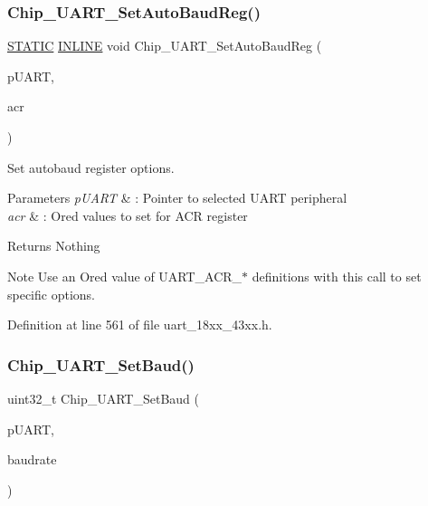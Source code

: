 \subsubsection{\texorpdfstring{Chip\+\_\+\+U\+A\+R\+T\+\_\+\+Set\+Auto\+Baud\+Reg()}{Chip\_UART\_SetAutoBaudReg()}}
{\footnotesize\ttfamily \hyperlink{group___l_p_c___types___public___macros_ga10b2d890d871e1489bb02b7e70d9bdfb}{S\+T\+A\+T\+IC} \hyperlink{spifi__18xx__43xx_8h_a2eb6f9e0395b47b8d5e3eeae4fe0c116}{I\+N\+L\+I\+NE} void Chip\+\_\+\+U\+A\+R\+T\+\_\+\+Set\+Auto\+Baud\+Reg (\begin{DoxyParamCaption}\item[{\hyperlink{struct_l_p_c___u_s_a_r_t___t}{L\+P\+C\+\_\+\+U\+S\+A\+R\+T\+\_\+T} $\ast$}]{p\+U\+A\+RT,  }\item[{uint32\+\_\+t}]{acr }\end{DoxyParamCaption})}



Set autobaud register options. 


\begin{DoxyParams}{Parameters}
{\em p\+U\+A\+RT} & \+: Pointer to selected U\+A\+RT peripheral \\
\hline
{\em acr} & \+: Or\textquotesingle{}ed values to set for A\+CR register \\
\hline
\end{DoxyParams}
\begin{DoxyReturn}{Returns}
Nothing 
\end{DoxyReturn}
\begin{DoxyNote}{Note}
Use an Or\textquotesingle{}ed value of U\+A\+R\+T\+\_\+\+A\+C\+R\+\_\+$\ast$ definitions with this call to set specific options. 
\end{DoxyNote}


Definition at line 561 of file uart\+\_\+18xx\+\_\+43xx.\+h.

\mbox{\label{group___u_a_r_t__18_x_x__43_x_x_ga19f24dcf53316cbfb204003f506d5be5}} 
\subsubsection{\texorpdfstring{Chip\+\_\+\+U\+A\+R\+T\+\_\+\+Set\+Baud()}{Chip\_UART\_SetBaud()}}
{\footnotesize\ttfamily uint32\+\_\+t Chip\+\_\+\+U\+A\+R\+T\+\_\+\+Set\+Baud (\begin{DoxyParamCaption}\item[{\hyperlink{struct_l_p_c___u_s_a_r_t___t}{L\+P\+C\+\_\+\+U\+S\+A\+R\+T\+\_\+T} $\ast$}]{p\+U\+A\+RT,  }\item[{uint32\+\_\+t}]{baudrate }\end{DoxyParamCaption})}



